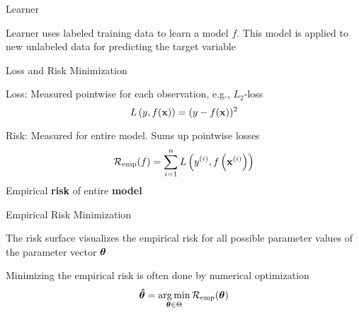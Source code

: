 \documentclass[11pt,compress,t,notes=noshow, xcolor=table]{beamer}
\begin{document}
\begin{framei}{Learner}
\item Learner uses labeled training data to learn a model $f$. This model is applied to new unlabeled data for predicting the target variable
\end{framei}


\begin{framei}{Loss and Risk Minimization}
\item Loss: Measured pointwise for each observation, e.g., $L_2$-loss
$$
L\left(y, f(\mathbf{x})\right) = (y - f(\mathbf{x}))^2
$$
\item Risk: Measured for entire model. Sums up pointwise losses
$$
\mathcal{R}_{\text{emp}}(f) = \sum\limits_{i=1}^n L\left(y^{(i)}, f\left(\mathbf{x}^{(i)}\right)\right)
$$
\vfill
{}
{
\center \small Empirical \textbf{risk} of entire \textbf{model}
}
\end{framei}


\begin{framei}[fs=small]{Empirical Risk Minimization}
\item The risk surface visualizes the empirical risk for all possible parameter values of the parameter vector $\bm{\theta}$
\item Minimizing the empirical risk is often done by numerical optimization
$$
\bm{\hat\theta} = \mathop{\mathrm{arg\,min}}_{\bm{\theta} \in \Theta} \mathcal{R}_{\text{emp}}(\bm{\theta})
$$
\end{framei}

\endlecture
\end{document}
